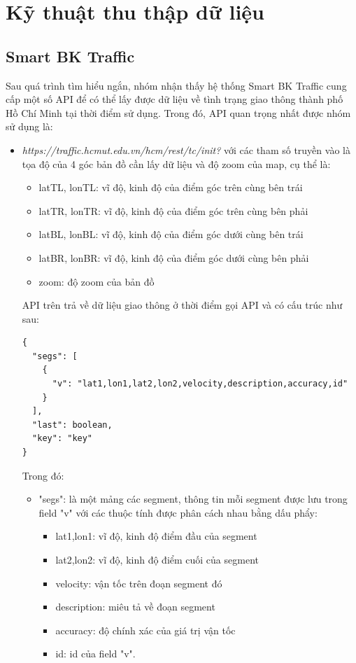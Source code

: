 
\chapter{Kỹ thuật thu thập dữ liệu} %

\label{Chapter4}
\section{Smart BK Traffic}
Sau quá trình tìm hiểu ngắn, nhóm nhận thấy hệ thống Smart BK Traffic cung cấp một số API để có thể lấy được dữ liệu về tình trạng giao thông thành phố Hồ Chí Minh tại thời điểm sử dụng. Trong đó, API quan trọng nhất được nhóm sử dụng là:
\begin{itemize}
    \item \textit{https://traffic.hcmut.edu.vn/hcm/rest/tc/init?} với các tham số truyền vào là tọa độ của 4 góc bản đồ cần lấy dữ liệu và độ zoom của map, cụ thể là:
\begin{itemize}
    \item latTL, lonTL: vĩ độ, kinh độ của điểm góc trên cùng bên trái
    \item latTR, lonTR: vĩ độ, kinh độ của điểm góc trên cùng bên phải
    \item latBL, lonBL: vĩ độ, kinh độ của điểm góc dưới cùng bên trái
    \item latBR, lonBR: vĩ độ, kinh độ của điểm góc dưới cùng bên phải
    \item zoom: độ zoom của bản đồ
\end{itemize}
    API trên trả về dữ liệu giao thông ở thời điểm gọi API và có cấu trúc như sau:
\begin{lstlisting}[language=XML]
{
  "segs": [
    {
      "v": "lat1,lon1,lat2,lon2,velocity,description,accuracy,id"
    }
  ],
  "last": boolean,
  "key": "key"
}
\end{lstlisting}
    Trong đó:
    \begin{itemize}
        \item "segs": là một mảng các segment, thông tin mỗi segment được lưu trong field "v" với các thuộc tính được phân cách nhau bằng dấu phẩy:
        \begin{itemize}
            \item lat1,lon1: vĩ độ, kinh độ điểm đầu của segment
            \item lat2,lon2: vĩ độ, kinh độ điểm cuối của segment
            \item velocity: vận tốc trên đoạn segment đó 
            \item description: miêu tả về đoạn segment
            \item accuracy: độ chính xác của giá trị vận tốc
            \item id: id của field "v".
        \end{itemize}
    

\end{itemize}
\end{itemize}
